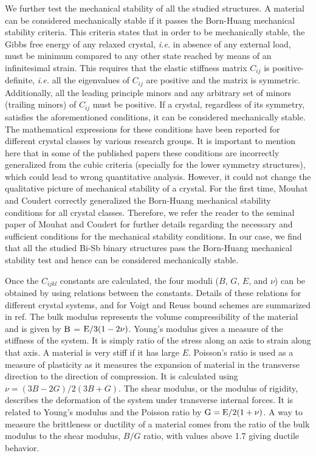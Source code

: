 \documentclass[twocolumn,superscriptaddress,nofootinbib,floatfix,aps,showpacs,prb,citeautoscript,reprint]{revtex4-1}
\begin{document}
We further test the mechanical stability of all the studied structures. A material can be considered mechanically stable if it passes the Born-Huang mechanical stability criteria. \cite{born1955dynamical, nye1985physical} This criteria states that in order to be mechanically stable, the Gibbs free energy of any relaxed crystal, {\it i.e.} in absence of any external load, must be minimum compared to any other state reached by means of an infinitesimal strain. This requires that the elastic stiffness matrix $C_{ij}$ is positive-definite,  {\it i.e.} all the eigenvalues of $C_{ij}$ are positive and the matrix is symmetric. Additionally, all the leading principle minors and any arbitrary set of minors (trailing minors) of $C_{ij}$ must be positive. If a crystal, regardless of its symmetry, satisfies the aforementioned conditions, it can be considered mechanically stable. The mathematical expressions for these conditions have been reported for different crystal classes by various research groups. \cite{PatilPRB2006, ZhijianPRB2007, WU_PRB2007, MouhatPRB2014} It is important to mention here that in some of the published papers \cite{PatilPRB2006, ZhijianPRB2007, WU_PRB2007} these conditions are incorrectly generalized from the cubic criteria (specially for the lower symmetry structures), which could lead to wrong quantitative analysis. However, it could not change the qualitative picture of mechanical stability of a crystal. For the first time, Mouhat and Coudert correctly generalized the Born-Huang mechanical stability conditions for all crystal classes. \cite{MouhatPRB2014} Therefore, we refer the reader to the seminal paper of Mouhat and Coudert for further details regarding the necessary and sufficient conditions for the mechanical stability conditions. \cite{MouhatPRB2014} In our case, we find that all the studied Bi-Sb binary structures pass the Born-Huang mechanical stability test and hence can be considered mechanically stable. 

Once the $C_{ijkl}$ constants are calculated, the four moduli ($B$, $G$, $E$, and $\nu$) can be obtained by using relations between the constants.\cite{Pugh1954} Details of these relations for different crystal systems, and for Voigt and Reuss bound schemes are summarized in ref.\cite{WU_PRB2007}  The bulk modulus represents the volume compressibility of the material and is given by $\rm{B}$ = $\rm{E}/{3(1-2\nu)}$. \cite{nye1985physical} Young's modulus gives a measure of the stiffness of the system. It is simply ratio of the stress along an axis to strain along that axis. A material is very stiff if it has large $E$. Poisson's ratio is used as a measure of plasticity as it measures the expansion of material in the transverse direction to the direction of compression. It is calculated using $\nu = (3B-2G)/2(3B+G)$. The shear modulus, or the modulus of rigidity, describes the deformation of the system under transverse internal forces. It is related to Young's modulus and the Poisson ratio by  $\rm{G}=\rm{E}/2(1+\nu)$.  A way to measure the brittleness or ductility of a material comes from the ratio of the bulk modulus to the shear modulus, $B/G$ ratio, with values above 1.7 giving ductile behavior. \cite{Pugh1954, Pavlic2017} 
\end{document}
